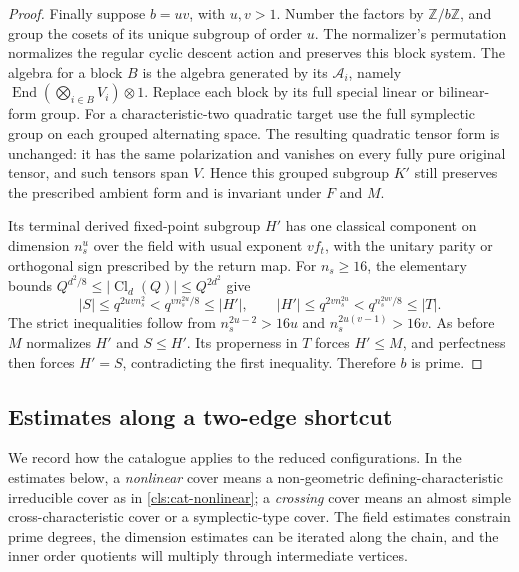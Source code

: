 \begin{proof}
Finally suppose $b=uv$, with $u,v>1$.  Number the factors by
$\mathbb Z/b\mathbb Z$, and group the cosets of its unique subgroup
of order $u$.  The normalizer's permutation normalizes the regular
cyclic descent action and preserves this block system.  The
algebra for a block $B$ is the algebra generated by its
$\mathcal A_i$, namely $\operatorname{End}(\bigotimes_{i\in B}V_i)
\otimes1$.  Replace each block by its full special linear or
bilinear-form group.  For a characteristic-two quadratic target
use the full symplectic group on each grouped alternating space.
The resulting quadratic tensor form is unchanged: it has the
same polarization and vanishes on every fully pure original
tensor, and such tensors span $V$.  Hence this grouped subgroup
$K'$ still preserves the prescribed ambient form and is invariant
under $F$ and $M$.

Its terminal derived fixed-point subgroup $H'$ has one classical
component on dimension $n_s^u$ over the field with usual exponent
$v f_t$, with the unitary parity or orthogonal sign prescribed by
the return map.  For $n_s\geq16$, the elementary bounds
$Q^{d^2/8}\leq|\operatorname{Cl}_d(Q)|\leq Q^{2d^2}$ give
\[
 |S|\leq q^{2uv n_s^2}
   <q^{v n_s^{2u}/8}\leq|H'|,
 \qquad
 |H'|\leq q^{2v n_s^{2u}}
   <q^{n_s^{2uv}/8}\leq|T|.
\]
The strict inequalities follow from
$n_s^{2u-2}>16u$ and $n_s^{2u(v-1)}>16v$.
As before $M$ normalizes $H'$ and $S\leq H'$.  Its properness in
$T$ forces $H'\leq M$, and perfectness then forces $H'=S$,
contradicting the first inequality.  Therefore $b$ is prime.
\end{proof}

\subsection{Estimates along a two-edge shortcut}

We record how the catalogue applies to the reduced configurations.
In the estimates below, a \emph{nonlinear} cover means a
non-geometric defining-characteristic irreducible cover as in
\ref{cls:cat-nonlinear}; a \emph{crossing} cover means an almost simple
cross-characteristic cover or a symplectic-type cover.
The field estimates constrain prime degrees, the dimension estimates
can be iterated along the chain, and the inner order quotients will
multiply through intermediate vertices.

